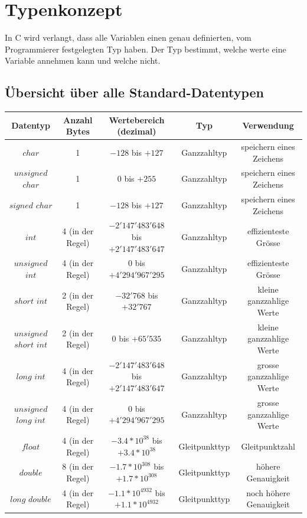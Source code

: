 \section{Typenkonzept }
	In C wird verlangt, dass alle Variablen einen genau definierten, vom Programmierer festgelegten Typ haben. Der Typ bestimmt, welche werte eine Variable annehmen kann und welche nicht.
	
	\subsection{Übersicht über alle Standard-Datentypen }
		\begin{tabular}{|c|c|c|c|c|}
				\hline
					\textbf{Datentyp} & \textbf{Anzahl Bytes} & \textbf{Wertebereich (dezimal)} & Typ & Verwendung\\
				\hline
				\hline
					$char$ & 1 & $-128$ bis $+127$ & Ganzzahltyp & speichern eines Zeichens\\
				\hline
					$unsigned$ $char$ & 1 & $0$ bis $+255$ & Ganzzahltyp & speichern eines Zeichens\\
				\hline
					$signed$ $char$ & 1 & $-128$ bis $+127$ & Ganzzahltyp & speichern eines Zeichens\\
				\hline
				\hline
					$int$ & 4 (in der Regel) & $-2'147'483'648$ bis $+2'147'483'647$ & Ganzzahltyp & effizienteste Grösse\\
				\hline
					$unsigned$ $int$ & 4 (in der Regel) & $0$ bis $+4'294'967'295$ & Ganzzahltyp & effizienteste Grösse\\
				\hline
				\hline
					$short$ $int$ & 2 (in der Regel) & $-32'768$ bis $+32'767$ & Ganzzahltyp & kleine ganzzahlige Werte\\
				\hline
					$unsigned$ $short$ $int$ & 2 (in der Regel) & $0$ bis $+65'535$ & Ganzzahltyp & kleine ganzzahlige Werte\\
				\hline
				\hline
					$long$ $int$ & 4 (in der Regel) & $-2'147'483'648$ bis $+2'147'483'647$ & Ganzzahltyp & grosse ganzzahlige Werte\\
				\hline
					$unsigned$ $long$ $int$ & 4 (in der Regel) & $0$ bis $+4'294'967'295$ & Ganzzahltyp & grosse ganzzahlige Werte\\
				\hline
				\hline
					$float$ & 4 (in der Regel) & $-3.4*10^{38}$ bis $+3.4*10^{38}$ & Gleitpunkttyp & Gleitpunktzahl\\
				\hline
					$double$ & 8 (in der Regel) & $-1.7*10^{308}$ bis $+1.7*10^{308}$ & Gleitpunkttyp & höhere Genauigkeit\\
				\hline
					$long$ $double$ & 4 (in der Regel) & $-1.1*10^{4932}$ bis $+1.1*10^{4932}$ & Gleitpunkttyp & noch höhere Genauigkeit\\
				\hline
			\end{tabular}

